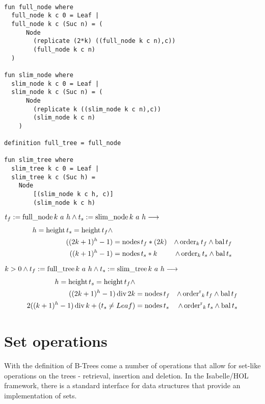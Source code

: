 \begin{lstlisting}[mathescape=true, language=Isabelle]

fun full_node where
  full_node k c 0 = Leaf |
  full_node k c (Suc n) = (
      Node
        (replicate (2*k) ((full_node k c n),c))
        (full_node k c n)
  )

fun slim_node where
  slim_node k c 0 = Leaf |
  slim_node k c (Suc n) = (
      Node
        (replicate k ((slim_node k c n),c))
        (slim_node k c n)
    )

definition full_tree = full_node

fun slim_tree where
  slim_tree k c 0 = Leaf |
  slim_tree k c (Suc h) =
    Node
        [(slim_node k c h, c)]
        (slim_node k c h)

\end{lstlisting}


\begin{lemma} $t_f := \operatorname{full\_node} k\ a\ h \wedge t_s := \operatorname{slim\_node} k\ a\ h \longrightarrow$
    \begin{align}
    h = \operatorname{height} t_s = \operatorname{height} t_f \wedge \\
    ((2k+1)^h - 1) &= \operatorname{nodes} t_f * (2k) &\wedge \operatorname{order}_k t_f \wedge \operatorname{bal} t_f \\ 
    ((k+1)^h - 1) &= \operatorname{nodes} t_s * k  &\wedge \operatorname{order}_k t_s \wedge \operatorname{bal} t_s
    \end{align}
\end{lemma}

\begin{theorem}
    $k > 0 \wedge t_f := \operatorname{full\_tree} k\ a\ h \wedge t_s := \operatorname{slim\_tree} k\ a\ h \longrightarrow$
    \begin{align}
    h = \operatorname{height} t_s = \operatorname{height} t_f \wedge \\
        ((2k+1)^h - 1) \operatorname{div} 2k &= \operatorname{nodes} t_f &\wedge \operatorname{order^r}_k t_f \wedge \operatorname{bal} t_f \\ 
        2((k+1)^h - 1) \operatorname{div} k + (t_s \neq Leaf) &= \operatorname{nodes} t_s &\wedge \operatorname{order^r}_k t_s \wedge \operatorname{bal} t_s
    \end{align}
\end{theorem}


\section{Set operations}

With the definition of B-Trees come a number of operations that allow for set-like operations
on the trees - retrieval, insertion and deletion.
In the Isabelle/HOL framework, there is a standard interface
for data structures that provide an implementation of sets.

